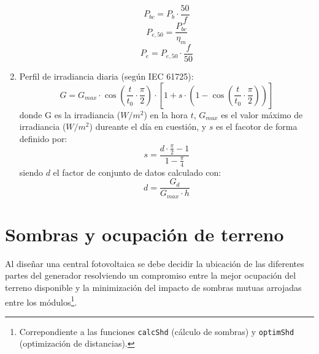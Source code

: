 \begin{enumerate}
\begin{equation}
P_{bc} = P_b \cdot \frac{50}{f}
\end{equation}
\begin{equation}
P_{e,50} = \frac{P_{bc}}{\eta_m}
\end{equation}
\begin{equation}
P_e = P_{e,50} \cdot \frac{f}{50}
\end{equation}
\item Perfil de irradiancia diaria (según IEC 61725):
\begin{equation}
G = G_{max} \cdot \cos\left(\frac{t}{t_0} \cdot \frac{\pi}{2}\right) \cdot \left[1 + s \cdot \left(1 - \cos\left(\frac{t}{t_0} \cdot \frac{\pi}{2}\right)\right)\right]
\end{equation}
donde G es la irradiancia (\(W/m^2\)) en la hora \(t\), \(G_{max}\) es el valor máximo de irradiancia (\(W/m^2\)) dureante el día en cuestión, y \(s\) es el facotor de forma definido por:
\begin{equation}
s = \frac{d \cdot \frac{\pi}{2} - 1}{1 - \frac{\pi}{4}}
\end{equation}
siendo \(d\) el factor de conjunto de datos calculado con:
\begin{equation}
d = \frac{G_d}{G_{max} \cdot h}
\end{equation}
\end{enumerate}

\section{Sombras y ocupación de terreno}
\label{sec:org71d23ea}
Al diseñar una central fotovoltaica se debe decidir la ubicación de las diferentes partes del generador resolviendo un compromiso entre la mejor ocupación del terreno disponible y la minimización del impacto de sombras mutuas arrojadas entre los módulos\footnote{Correpondiente a las funciones \texttt{calcShd} (cálculo de sombras) y \texttt{optimShd} (optimización de distancias).}.

